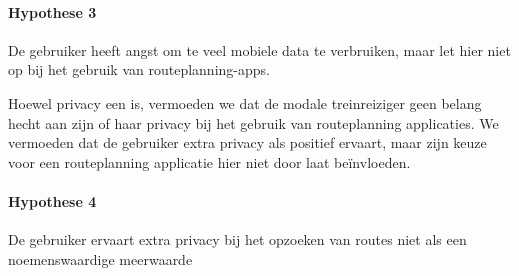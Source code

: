 \paragraph{Hypothese 3} De gebruiker heeft angst om te veel mobiele data te verbruiken, maar let hier niet op bij het gebruik van routeplanning-apps.
 
Hoewel privacy een  is, vermoeden we dat de modale treinreiziger geen belang hecht aan zijn of haar privacy bij het gebruik van routeplanning applicaties. We vermoeden dat de gebruiker extra privacy als positief ervaart, maar zijn keuze voor een routeplanning applicatie hier niet door laat beïnvloeden.
\paragraph{Hypothese 4} De gebruiker ervaart extra privacy bij het opzoeken van routes niet als een noemenswaardige meerwaarde
